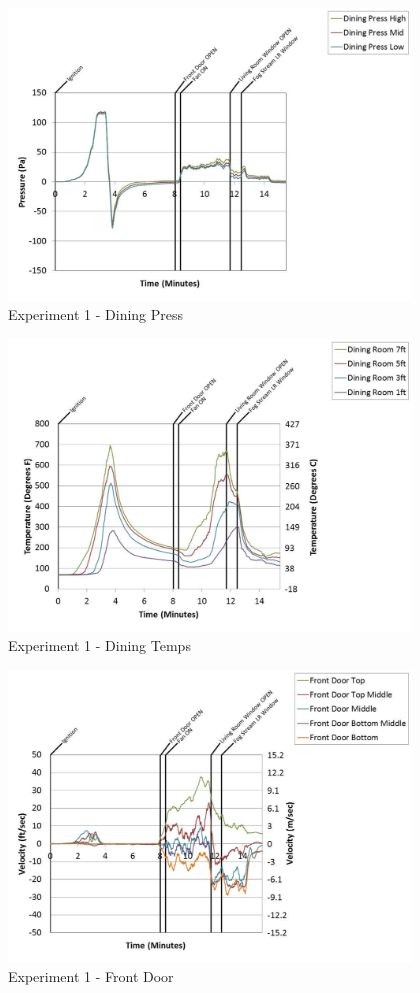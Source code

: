 \documentclass{article}
\begin{document}
\begin{appendices}
	\begin{figure}[h!]
		\centering
		\includegraphics[height=3.05in]{0_Images/Results_Charts/Exp_1_Charts/DiningPress.pdf}
		\caption{Experiment 1 - Dining Press}
	\end{figure}
 
	\clearpage

	\begin{figure}[h!]
		\centering
		\includegraphics[height=3.05in]{0_Images/Results_Charts/Exp_1_Charts/DiningTemps.pdf}
		\caption{Experiment 1 - Dining Temps}
	\end{figure}
 

	\begin{figure}[h!]
		\centering
		\includegraphics[height=3.05in]{0_Images/Results_Charts/Exp_1_Charts/FrontDoor.pdf}
		\caption{Experiment 1 - Front Door}
	\end{figure}
 

\end{appendices}
\end{document}
